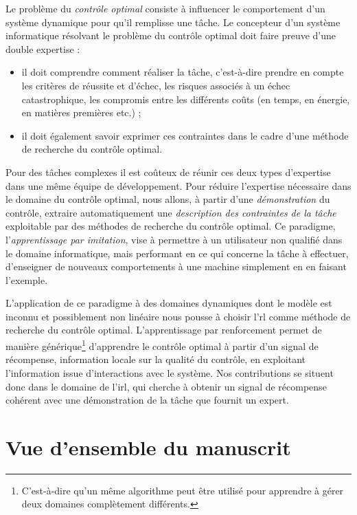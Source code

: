 \documentclass[frenchb,a4paper,justified,notoc]{tufte-book}
\begin{document}
Le problème du \emph{contrôle optimal} consiste à influencer le comportement d'un système dynamique pour qu'il remplisse une tâche. Le concepteur d'un système informatique résolvant le problème du contrôle optimal doit faire preuve d'une double expertise :
\begin{itemize}
\item il doit comprendre comment réaliser la tâche, c'est-à-dire prendre en compte les critères de réussite et d'échec, les risques associés à un échec catastrophique, les compromis entre les différents coûts (en temps, en énergie, en matières premières etc.) ;
\item il doit également savoir exprimer ces contraintes dans le cadre d'une méthode de recherche du contrôle optimal.
\end{itemize}


Pour des tâches complexes il est coûteux de réunir ces deux types d'expertise dans une même équipe de développement. Pour réduire l'expertise nécessaire dans le domaine du contrôle optimal, nous allons, à partir d'une \emph{démonstration} du contrôle, extraire automatiquement une \emph{description des contraintes de la tâche} exploitable par des méthodes de recherche du contrôle optimal. Ce paradigme, l'\emph{apprentissage par imitation}, vise à permettre à un utilisateur non qualifié dans le domaine informatique, mais performant en ce qui concerne la tâche à effectuer, d'enseigner de nouveaux comportements à une machine simplement en en faisant l'exemple.

L'application de ce paradigme à des domaines dynamiques dont le modèle est inconnu et possiblement non linéaire nous pousse à choisir l'\gls{rl} comme méthode de recherche du contrôle optimal. L'apprentissage par renforcement permet de manière générique\footnote{C'est-à-dire qu'un même algorithme peut être utilisé pour apprendre à gérer deux domaines complètement différents.
 } d'apprendre le contrôle optimal à partir d'un signal de récompense, information locale sur la qualité du contrôle, en exploitant l'information issue d'interactions avec le système. Nos contributions se situent donc dans le domaine de l'\gls{irl}, qui cherche à obtenir un signal de récompense cohérent avec une démonstration de la tâche que fournit un expert.
\section{Vue d'ensemble du manuscrit}
\label{sec-1-2}
\end{document}
